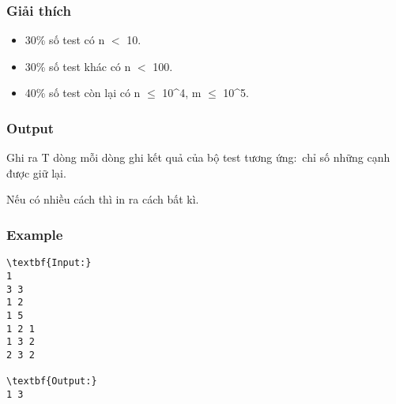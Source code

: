\subsubsection{Giải thích}
\begin{itemize}
	\item 30\% số test có n $<$ 10.
	\item 30\% số test khác có n $<$ 100.
	\item 40\% số test còn lại có n  $\le$  10^4, m  $\le$  10^5.
\end{itemize}

\subsubsection{Output}

Ghi ra T dòng mỗi dòng ghi kết quả của bộ test tương ứng: chỉ số những cạnh được giữ lại.

Nếu có nhiều cách thì in ra cách bất kì.

\subsubsection{Example}
\begin{verbatim}
\textbf{Input:}
1
3 3
1 2
1 5
1 2 1
1 3 2
2 3 2

\textbf{Output:}
1 3
\end{verbatim}
